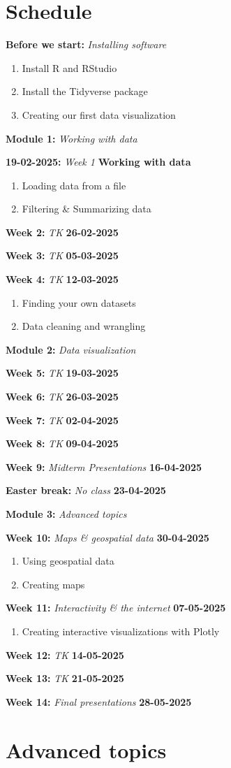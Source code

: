 \documentclass{article}
\newcommand{\week}[3]{
    \begin{center}
        \textbf{#1:} \textit{#2} \dotfill \textbf{#3}
    \end{center}
}
\newcommand{\module}[2]{
    \vspace{1em}
    \large
    \textbf{#1:} \textit{#2}
    \normalsize
}
\begin{document}
\section*{Schedule}

\module{Before we start}{Installing software}
\begin{enumerate}
    \item Install R and RStudio
    \item Install the Tidyverse package
    \item Creating our first data visualization
\end{enumerate}

\module{Module 1}{Working with data}

\week{19-02-2025}{Week 1}{Working with data}
\begin{enumerate}
    \item Loading data from a file
    \item Filtering & Summarizing data
\end{enumerate}

\week{Week 2}{TK}{26-02-2025}
\week{Week 3}{TK}{05-03-2025}
\week{Week 4}{TK}{12-03-2025}
\begin{enumerate}
    \item Finding your own datasets
    \item Data cleaning and wrangling
\end{enumerate}

\module{Module 2}{Data visualization}

\week{Week 5}{TK}{19-03-2025}
\week{Week 6}{TK}{26-03-2025}
\week{Week 7}{TK}{02-04-2025}
\week{Week 8}{TK}{09-04-2025}
\week{Week 9}{Midterm Presentations}{16-04-2025}
\week{Easter break}{No class}{23-04-2025}

\module{Module 3}{Advanced topics}

\week{Week 10}{Maps \& geospatial data}{30-04-2025}
\begin{enumerate}
    \item Using geospatial data
    \item Creating maps
\end{enumerate}

\week{Week 11}{Interactivity \& the internet}{07-05-2025}
\begin{enumerate}
    \item Creating interactive visualizations with Plotly
\end{enumerate}

\week{Week 12}{TK}{14-05-2025}
\week{Week 13}{TK}{21-05-2025}

\week{Week 14}{Final presentations}{28-05-2025}


\section{Advanced topics}
\end{document}

